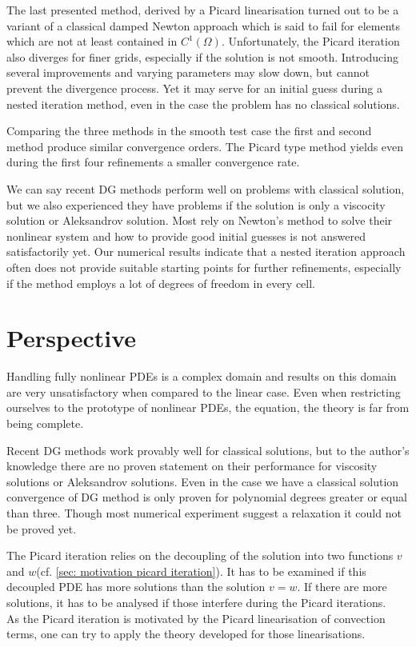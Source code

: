 The last presented method, derived by a Picard linearisation turned out to be a variant of a classical damped Newton approach which is said to fail for elements which are not at least contained in $C^1(\Omega)$.
Unfortunately, the Picard iteration also diverges for finer grids, especially if the solution is not smooth. Introducing several improvements and varying parameters may slow down, but cannot prevent the divergence process. Yet it may serve for an initial guess during a nested iteration method, even in the case the problem has no classical solutions.

Comparing the three methods in the smooth test case the first and second method produce similar convergence orders. %
The Picard type method yields even during the first four refinements a smaller convergence rate. 

We can say recent DG methods perform well on problems with classical solution, but we also experienced they have problems if the \MA solution is only a viscocity solution or Aleksandrov solution. Most rely on Newton's method to solve their nonlinear system and how to provide good initial guesses is not answered satisfactorily yet.
Our numerical results indicate that a nested iteration approach often does not provide suitable starting points for further refinements, especially if the method employs a lot of degrees of freedom in every cell.

\section{Perspective}
Handling fully nonlinear PDEs is a complex domain and results on this domain are very unsatisfactory when compared to the linear case. Even when restricting ourselves to the prototype of nonlinear PDEs, the \MA equation, the theory is far from being complete. %

Recent DG methods work provably well for classical solutions, but to the author's knowledge there are no proven statement on their performance for viscosity solutions or Aleksandrov solutions. Even in the case we have a classical solution convergence of DG method is only proven for polynomial degrees greater or equal than three. Though most numerical experiment suggest a relaxation it could not be proved yet.

The Picard iteration relies on the decoupling of the solution into two functions $v$ and $w$(cf. \ref{sec: motivation picard iteration}). It has to be examined if this decoupled PDE has more solutions than the solution $v=w$. If there are more solutions, it has to be analysed if those interfere during the Picard iterations. \\
As the Picard iteration is motivated by the Picard linearisation of convection terms, one can try to apply the theory developed for those linearisations.

